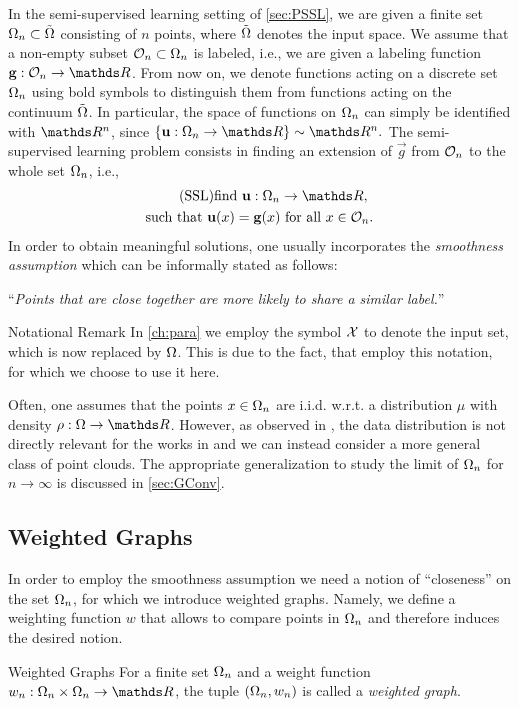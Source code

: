 In the semi-supervised learning setting of \cref{sec:PSSL}, we are given a finite set $\Omega_n\subset \tilde{\Omega}$ consisting of $n$ points, where $\tilde{\Omega}$ 
denotes the input space. We assume that a non-empty subset $\mathcal{O}_n \subset \Omega_n$ is labeled, i.e., we are given a labeling function
$\vec g:\conset_n\to\R$. From now on, we denote functions acting on a discrete set $\Omega_n$ using bold symbols to distinguish them from functions acting on the continuum $\tilde{\Omega}$. In particular, the space of functions on $\Omega_n$ can simply be identified with $\R^n$, since $\{\vec u:\domain_n\to\R\} \sim \R^n.$
%
\noindent%
The semi-supervised learning problem consists in finding an extension of $\vec g$ from $\mathcal{O}_n$ to the whole set $\Omega_n$, i.e.,
%
\begin{gather}\label{eq:SSL}
\begin{gathered}\tag{SSL}
\text{find } \vec u:\domain_n\to\R,\\
\text{such that } \vec u(x) = \vec g(x) \text{ for all } x\in\conset_n.
\end{gathered}
\end{gather}
%
%
%
%
In order to obtain meaningful solutions, one usually incorporates the \emph{smoothness assumption} \cite{subramanya2014graph} which can be informally stated as follows:
%
\begin{center}
\enquote{\textit{Points that are close together are more likely to share a similar label.}}
\end{center}
%
%

\begin{remark}{Notational Remark}{}
In \cref{ch:para} we employ the symbol $\mathcal{X}$ to denote the input set, which is now replaced by $\Omega$. This is due to the fact, that \cite{roith2022continuum,bungert2021uniform, bungert2022ratio} employ this notation, for which we choose to use it here.
\end{remark}
%
%
\noindent%
Often, one assumes that the points $x\in\Omega_n$ are i.i.d. w.r.t. a distribution $\mu$ with density $\rho:\domain\to\R$. However, as observed in \cite{roith2022msc}, the data distribution is not directly relevant for the works in \cite{roith2022continuum, bungert2021uniform} and we can instead consider a more general class of point clouds. The appropriate generalization to study the limit of $\Omega_n$ for $n\to\infty$ is discussed in \cref{sec:GConv}.
%
%
\subsection{Weighted Graphs}
In order to employ the smoothness assumption we need a notion of \enquote{closeness} on the set $\Omega_n$, for which we introduce weighted graphs. Namely, we define a weighting function $w$ that allows to compare points in $\Omega_n$ and therefore induces the desired notion. 
%
\begin{definition}{Weighted Graphs}{}
For a finite set $\Omega_n$ and a weight function $w_n:\domain_n\times \domain_n\to\R$, the tuple $(\Omega_n,w_n)$ is called a \emph{weighted graph}.
\end{definition}
%
%
